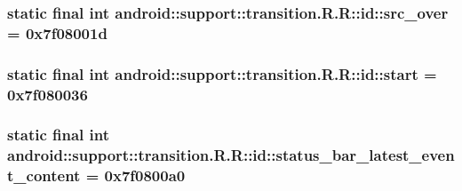 \hypertarget{classandroid_1_1support_1_1transition_1_1_r_1_1id_c72ee5a1158cd7e45bc745ac823c3861}{
\subsubsection[{src\_\-over}]{\setlength{\rightskip}{0pt plus 5cm}static final int android::support::transition.R.R::id::src\_\-over = 0x7f08001d}}
\label{classandroid_1_1support_1_1transition_1_1_r_1_1id_c72ee5a1158cd7e45bc745ac823c3861}


\hypertarget{classandroid_1_1support_1_1transition_1_1_r_1_1id_d3c7bffc754c0eb2c0e1f6e4e6913cdc}{
\subsubsection[{start}]{\setlength{\rightskip}{0pt plus 5cm}static final int android::support::transition.R.R::id::start = 0x7f080036}}
\label{classandroid_1_1support_1_1transition_1_1_r_1_1id_d3c7bffc754c0eb2c0e1f6e4e6913cdc}


\hypertarget{classandroid_1_1support_1_1transition_1_1_r_1_1id_55aaca1e2008de7fa1ed9766331bd4f2}{
\subsubsection[{status\_\-bar\_\-latest\_\-event\_\-content}]{\setlength{\rightskip}{0pt plus 5cm}static final int android::support::transition.R.R::id::status\_\-bar\_\-latest\_\-event\_\-content = 0x7f0800a0}}
\label{classandroid_1_1support_1_1transition_1_1_r_1_1id_55aaca1e2008de7fa1ed9766331bd4f2}


